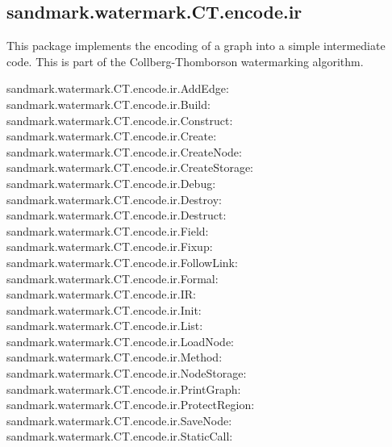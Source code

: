 \subsection{sandmark.watermark.CT.encode.ir}
This package implements the encoding of a graph
into a simple intermediate code. This is part of the 
Collberg-Thomborson watermarking algorithm.
\begin{description}
   \item[sandmark.watermark.CT.encode.ir.AddEdge:]
   \item[sandmark.watermark.CT.encode.ir.Build:]
   \item[sandmark.watermark.CT.encode.ir.Construct:]
   \item[sandmark.watermark.CT.encode.ir.Create:]
   \item[sandmark.watermark.CT.encode.ir.CreateNode:]
   \item[sandmark.watermark.CT.encode.ir.CreateStorage:]
   \item[sandmark.watermark.CT.encode.ir.Debug:]
   \item[sandmark.watermark.CT.encode.ir.Destroy:]
   \item[sandmark.watermark.CT.encode.ir.Destruct:]
   \item[sandmark.watermark.CT.encode.ir.Field:]
   \item[sandmark.watermark.CT.encode.ir.Fixup:]
   \item[sandmark.watermark.CT.encode.ir.FollowLink:]
   \item[sandmark.watermark.CT.encode.ir.Formal:]
   \item[sandmark.watermark.CT.encode.ir.IR:]
   \item[sandmark.watermark.CT.encode.ir.Init:]
   \item[sandmark.watermark.CT.encode.ir.List:]
   \item[sandmark.watermark.CT.encode.ir.LoadNode:]
   \item[sandmark.watermark.CT.encode.ir.Method:]
   \item[sandmark.watermark.CT.encode.ir.NodeStorage:]
   \item[sandmark.watermark.CT.encode.ir.PrintGraph:]
   \item[sandmark.watermark.CT.encode.ir.ProtectRegion:]
   \item[sandmark.watermark.CT.encode.ir.SaveNode:]
   \item[sandmark.watermark.CT.encode.ir.StaticCall:]
\end{description}

